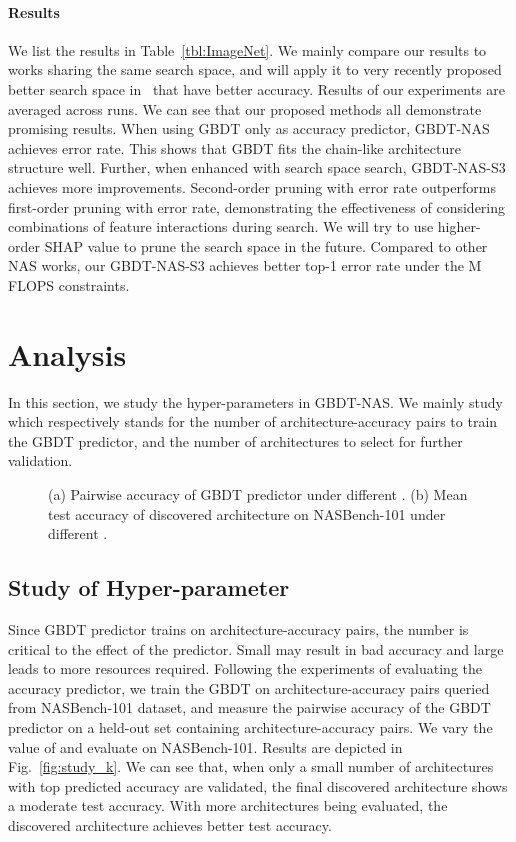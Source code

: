\documentclass{article}
\begin{document}
\paragraph{Results} We list the results in Table~\ref{tbl:ImageNet}. We mainly compare our results to works sharing the same search space, and will apply it to very recently proposed better search space in~\cite{onceforall,bignas,fbnetv2,fbnetv3} that have better accuracy. Results of our experiments are averaged across  runs. We can see that our proposed methods all demonstrate promising results. When using GBDT only as accuracy predictor, GBDT-NAS achieves  error rate. This shows that GBDT fits the chain-like architecture structure well. Further, when enhanced with search space search, GBDT-NAS-S3 achieves more improvements. Second-order pruning with  error rate outperforms first-order pruning with  error rate, demonstrating the effectiveness of considering combinations of feature interactions during search. We will try to use higher-order SHAP value to prune the search space in the future. Compared to other NAS works, our GBDT-NAS-S3 achieves better top-1 error rate under the M FLOPS constraints.

\section{Analysis}
In this section, we study the hyper-parameters in GBDT-NAS. We mainly study  which respectively stands for the number of architecture-accuracy pairs to train the GBDT predictor, and the number of architectures to select for further validation.

\begin{figure}[htbp]
\centering
{}
\caption{(a) Pairwise accuracy of GBDT predictor under different . (b) Mean test accuracy of discovered architecture on NASBench-101 under different .}
\end{figure}

\subsection{Study of Hyper-parameter }
Since GBDT predictor trains on  architecture-accuracy pairs, the number  is critical to the effect of the predictor. Small  may result in bad accuracy and large  leads to more resources required. Following the experiments of evaluating the accuracy predictor, we train the GBDT on  architecture-accuracy pairs queried from NASBench-101 dataset, and measure the pairwise accuracy of the GBDT predictor on a held-out set containing  architecture-accuracy pairs. We vary the value of  and evaluate on NASBench-101. Results are depicted in Fig.~\ref{fig:study_k}. We can see that, when only a small number of architectures with top predicted accuracy are validated, the final discovered architecture shows a moderate test accuracy. With more architectures being evaluated, the discovered architecture achieves better test accuracy.
\end{document}
